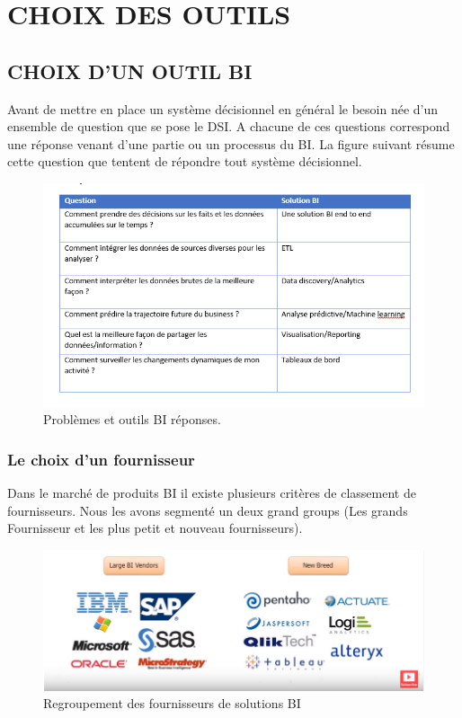 \chapter{CHOIX DES OUTILS}
\section{CHOIX D'UN OUTIL BI}
Avant de mettre en place un système décisionnel en général le besoin née d’un ensemble de question que se pose le DSI. A chacune de ces questions correspond une réponse venant d’une partie ou un processus du BI. La figure suivant résume cette question que tentent de répondre tout système décisionnel.

\begin{figure}[!htbp]
	\begin{center}
		\includegraphics[scale=0.95]{images/tab_question_bi.png}
		\caption{Problèmes et outils BI réponses.}
		\label{use_bi_tools}
	\end{center}
\end{figure}

\subsection{Le choix d’un fournisseur}

Dans le marché de produits BI il existe  plusieurs critères de classement de fournisseurs. Nous les avons segmenté un deux grand groups (Les grands Fournisseur et les plus petit et nouveau fournisseurs).

\begin{figure}[!htbp]
	\begin{center}
		\includegraphics[scale=0.75]{images/compare_bi_vendors.png}
		\caption{Regroupement des fournisseurs de solutions BI}
		\label{use_bi_tools}
	\end{center}
\end{figure}


